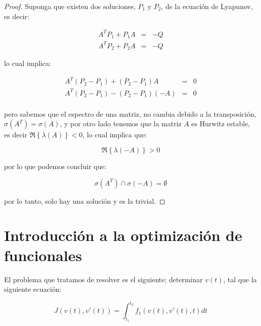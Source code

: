         \begin{proof}
            Suponga que existen dos soluciones, $P_1$ y $P_2$, de la ecuación de Lyapunov, es decir:

            \begin{eqnarray*}
                A^T P_1 + P_1 A & = & -Q \\
                A^T P_2 + P_2 A & = & -Q
            \end{eqnarray*}

            lo cual implica:

            \begin{eqnarray*}
                A^T (P_2 - P_1) + (P_2 - P_1) A & = & 0 \\
                A^T (P_2 - P_1) - (P_2 - P_1) (-A) & = & 0 \\
            \end{eqnarray*}

            pero sabemos que el espectro de una matriz, no cambia debido a la transposición, $\sigma(A^T) = \sigma(A)$, y por otro lado tenemos que la matriz $A$ es Hurwitz estable, es decir $\Re{\left\{ \lambda(A)\right\}} < 0$, lo cual implica que:

            \begin{equation*}
                \Re{\left\{ \lambda(-A) \right\}} > 0
            \end{equation*}

            por lo que podemos concluir que:

            \begin{equation*}
                \sigma(A^T) \cap \sigma(-A) = \emptyset
            \end{equation*}

            por lo tanto, solo hay una solución y es la trivial.
        \end{proof}

    \newpage
    \section{Introducción a la optimización de funcionales}

        El problema que tratamos de resolver es el siguiente; determinar $v(t)$, tal que la siguiente ecuación:

        \begin{equation} \label{eq:opfun1}
            J(v(t), v'(t)) = \int_{t_1}^{t_2} f_1(v(t), v'(t), t) dt
        \end{equation}

